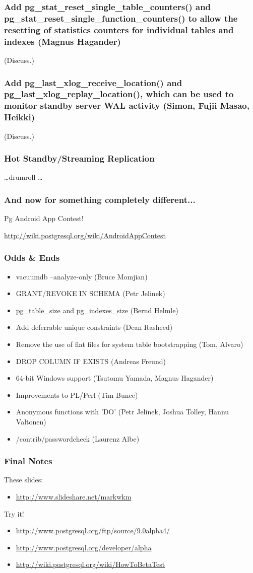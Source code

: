 \documentclass{beamer}
\begin{document}
\frame
{
  \frametitle{Add pg\_stat\_reset\_single\_table\_counters() 
  and pg\_stat\_reset\_single\_function\_counters() 
  to allow the resetting of statistics counters for 
  individual tables and indexes (Magnus Hagander)}

  (Discuss.)
}

\frame
{
  \frametitle{Add pg\_last\_xlog\_receive\_location() 
  and pg\_last\_xlog\_replay\_location(), which can be used to monitor 
  standby server WAL activity (Simon, Fujii Masao, Heikki)}

  (Discuss.)
}

\frame
{
  \frametitle{Hot Standby/Streaming Replication}

  \ldots drumroll \ldots
}

\frame
{
  \frametitle{And now for something completely different...}

  \begin{center}
  Pg Android App Contest!
  \end{center}
  \url{http://wiki.postgresql.org/wiki/AndroidAppContest}
}

\frame
{
  \frametitle{Odds \& Ends}
  \begin{itemize}
  \item[] vacuumdb --analyze-only (Bruce Momjian)
  \item[] GRANT/REVOKE IN SCHEMA (Petr Jelinek)
  \item[] pg\_table\_size and pg\_indexes\_size (Bernd Helmle)
  \item[] Add deferrable unique constraints (Dean Rasheed)
  \item[] Remove the use of flat files for system table bootstrapping (Tom, Alvaro)
  \item[] DROP COLUMN IF EXISTS (Andreas Freund)
  \item[] 64-bit Windows support (Tsutomu Yamada, Magnus Hagander)
  \item[] Improvements to PL/Perl (Tim Bunce)
  \item[] Anonymous functions with 'DO' (Petr Jelinek, Joshua Tolley, Hannu Valtonen)
  \item[] /contrib/passwordcheck (Laurenz Albe)
  \end{itemize}
}

\frame
{
  \frametitle{Final Notes}

  These slides:\\
  \begin{itemize}
  \item[] \url{http://www.slideshare.net/markwkm}
  \end{itemize}

  Try it!\\
  \begin{itemize}
  \item[] \url{http://www.postgresql.org/ftp/source/9.0alpha4/}
  \item[] \url{http://www.postgresql.org/developer/alpha}
  \item[] \url{http://wiki.postgresql.org/wiki/HowToBetaTest}
  \end{itemize}
}
\end{document}
